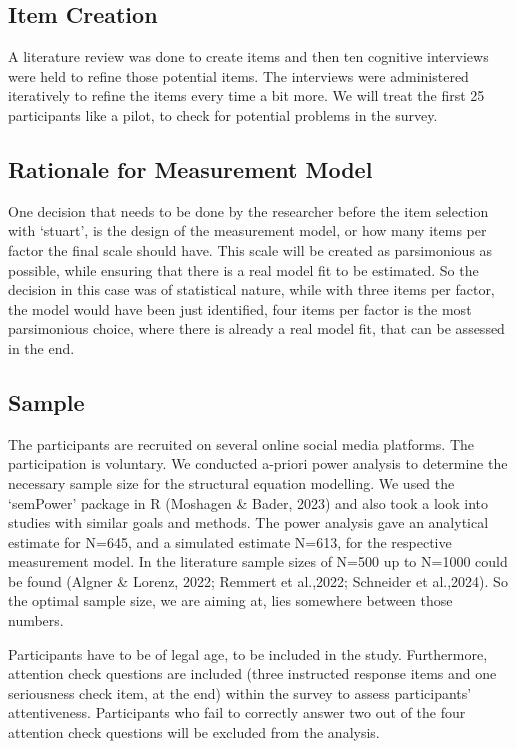 \documentclass[
  12pt,
  a4paper,
  twoside]{article}
\begin{document}
\subsection{Item Creation}\label{item-creation}

A literature review was done to create items and then ten cognitive interviews were held to refine those potential items. The interviews were administered iteratively to refine the items every time a bit more. We will treat the first 25 participants like a pilot, to check for potential problems in the survey.

\subsection{Rationale for Measurement Model}\label{rationale-for-measurement-model}

One decision that needs to be done by the researcher before the item selection with `stuart', is the design of the measurement model, or how many items per factor the final scale should have.
This scale will be created as parsimonious as possible, while ensuring that there is a real model fit to be estimated. So the decision in this case was of statistical nature, while with three items per factor, the model would have been just identified, four items per factor is the most parsimonious choice, where there is already a real model fit, that can be assessed in the end.

\subsection{Sample}\label{sample}

The participants are recruited on several online social media platforms. The participation is voluntary. We conducted a-priori power analysis to determine the necessary sample size for the structural equation modelling. We used the `semPower' package in R (Moshagen \& Bader, 2023) and also took a look into studies with similar goals and methods. The power analysis gave an analytical estimate for N=645, and a simulated estimate N=613, for the respective measurement model. In the literature sample sizes of N=500 up to N=1000 could be found (Algner \& Lorenz, 2022; Remmert et al.,2022; Schneider et al.,2024). So the optimal sample size, we are aiming at, lies somewhere between those numbers.

Participants have to be of legal age, to be included in the study. Furthermore, attention check questions are included (three instructed response items and one seriousness check item, at the end) within the survey to assess participants' attentiveness. Participants who fail to correctly answer two out of the four attention check questions will be excluded from the analysis.
\end{document}
